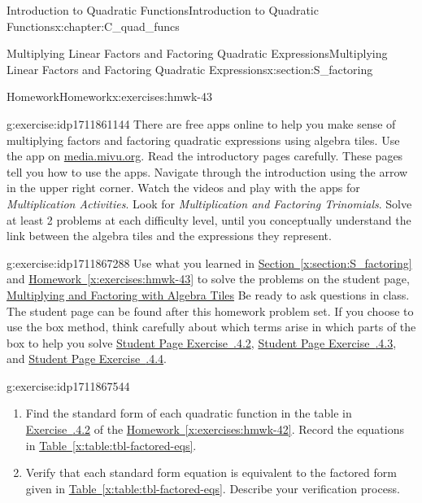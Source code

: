 \documentclass[oneside,10pt,]{book}
\newcommand{\xreffont}{\relax}
\newcommand{\pubtitle}[1]{\textsl{#1}}
\numberwithin{equation}{chapter}
\begin{document}
\begin{chapterptx}{Introduction to Quadratic Functions}{}{Introduction to Quadratic Functions}{}{}{x:chapter:C_quad_funcs}
\begin{sectionptx}{Multiplying Linear Factors and Factoring Quadratic Expressions}{}{Multiplying Linear Factors and Factoring Quadratic Expressions}{}{}{x:section:S_factoring}
\begin{exercises-subsection}{Homework}{}{Homework}{}{}{x:exercises:hmwk-43}
\begin{divisionexercise}{2}{}{}{g:exercise:idp1711861144}%
There are free apps online to help you make sense of multiplying factors and factoring quadratic expressions using algebra tiles. Use the app on \href{http://media.mivu.org/mvu_pd/a4a/homework/index.html}{media.mivu.org}\footnotemark{}. Read the introductory pages carefully. These pages tell you how to use the apps. Navigate through the introduction using the arrow in the upper right corner. Watch the videos and play with the apps for \pubtitle{Multiplication Activities}. Look for \pubtitle{Multiplication and Factoring Trinomials}. Solve at least 2 problems at each difficulty level, until you conceptually understand the link between the algebra tiles and the expressions they represent.%
\end{divisionexercise}%
%
\begin{divisionexercise}{3}{}{}{g:exercise:idp1711867288}%
Use what you learned in \hyperref[x:section:S_factoring]{Section~{\xreffont\ref{x:section:S_factoring}}} and \hyperref[x:exercises:hmwk-43]{Homework~{\xreffont\ref{x:exercises:hmwk-43}}} to solve the problems on the student page, \hyperref[x:worksheet:act-mult-fact-tiles]{Multiplying and Factoring with Algebra Tiles} Be ready to ask questions in class. The student page can be found after this homework problem set. If you choose to use the box method, think carefully about which terms arise in which parts of the box to help you solve \hyperlink{x:exercise:exer-factor-quad-2}{Student Page Exercise~{\xreffont 4.3.4.2}}, \hyperlink{x:exercise:exer-factor-quad-3}{Student Page Exercise~{\xreffont 4.3.4.3}}, and \hyperlink{x:exercise:exer-factor-quad-4}{Student Page Exercise~{\xreffont 4.3.4.4}}.%
\end{divisionexercise}%
\begin{divisionexercise}{4}{}{}{g:exercise:idp1711867544}%
\begin{enumerate}[font=\bfseries,label=(\alph*),ref=\alph*]
\item{}Find the standard form of each quadratic function in the table in \hyperlink{x:exercise:exer-factored-eqs}{Exercise~{\xreffont 4.2.4.2}} of the \hyperref[x:exercises:hmwk-42]{Homework~{\xreffont\ref{x:exercises:hmwk-42}}}. Record the equations in \hyperref[x:table:tbl-factored-eqs]{Table~{\xreffont\ref{x:table:tbl-factored-eqs}}}.%
\item{}Verify that each standard form equation is equivalent to the factored form given in \hyperref[x:table:tbl-factored-eqs]{Table~{\xreffont\ref{x:table:tbl-factored-eqs}}}. Describe your verification process.%

\end{enumerate}
\end{divisionexercise}
\end{exercises-subsection}
\end{sectionptx}
\end{chapterptx}
\end{document}

